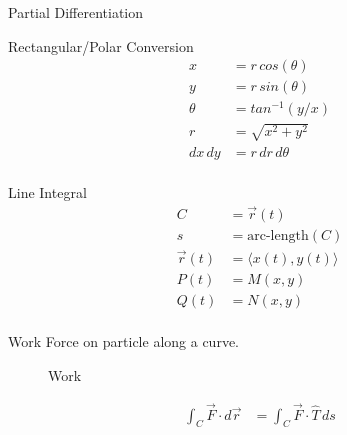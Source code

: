 \begin{section}{Partial Differentiation}
  \begin{section}{Rectangular/Polar Conversion}
    \begin{align*}
      x &= r\,cos(\theta) \\
      y &= r\,sin(\theta) \\
      \theta &= tan^{-1}(y/x) \\
      r &= \sqrt{x^2+y^2} \\
      dx\,dy &= r\,dr\,d\theta\\
    \end{align*}
  \end{section}

  \begin{section}{Line Integral}
    \begin{align*}
      C &=\vec{r}(t) \\
      s &= \text{arc-length}(C) \\
      \vec{r}(t) &=\langle x(t),y(t) \rangle  \\
      P(t) &= M(x,y) \\
      Q(t) &= N(x,y) \\
    \end{align*}
    \begin{subsection}{Work}
      Force on particle along a curve.
      \begin{figure}[h!]
        \begin{center}
          \caption{Work}
        \end{center}
      \end{figure}
      \begin{align*}
        \int_C \vec{F} \cdot d\vec{r} &= \int_C \vec{F} \cdot \hat{T} \, ds \\

\end{align*}
\end{subsection}
\end{section}
\end{section}
